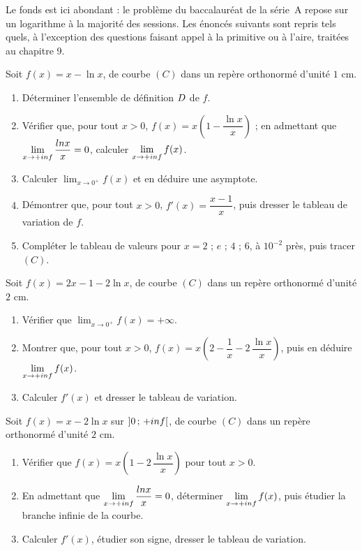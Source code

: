 \begin{annales}
Le fonds est ici abondant : le problème du baccalauréat de la série~A repose
sur un logarithme à la majorité des sessions. Les énoncés suivants sont
repris tels quels, à l'exception des questions faisant appel à la primitive
ou à l'aire, traitées au chapitre 9.

Soit $f(x) = x-\ln x$, de courbe $(C)$ dans un repère orthonormé d'unité
$1$ cm.
\begin{enumerate}[label=\textbf{\alph*)}, leftmargin=*, itemsep=0.15em]
  \item Déterminer l'ensemble de définition $D$ de $f$.
  \item Vérifier que, pour tout $x>0$,
        $f(x) = x\left(1-\dfrac{\ln x}{x}\right)$ ; en admettant que
        $\limpinf \dfrac{\ln x}{x} = 0$, calculer $\limpinf f(x)$.
  \item Calculer $\displaystyle\lim_{x \to 0^{+}} f(x)$ et en déduire une
        asymptote.
  \item Démontrer que, pour tout $x>0$, $f'(x) = \dfrac{x-1}{x}$, puis
        dresser le tableau de variation de $f$.
  \item Compléter le tableau de valeurs pour $x = 2$ ; $e$ ; $4$ ; $6$, à
        $10^{-2}$ près, puis tracer $(C)$.
\end{enumerate}

Soit $f(x) = 2x-1-2\ln x$, de courbe $(C)$ dans un repère orthonormé
d'unité $2$ cm.
\begin{enumerate}[label=\textbf{\alph*)}, leftmargin=*, itemsep=0.15em]
  \item Vérifier que $\displaystyle\lim_{x \to 0^{+}} f(x) = +\infty$.
  \item Montrer que, pour tout $x>0$,
        $f(x) = x\left(2-\dfrac1x-2\,\dfrac{\ln x}{x}\right)$, puis en
        déduire $\limpinf f(x)$.
  \item Calculer $f'(x)$ et dresser le tableau de variation.
\end{enumerate}

Soit $f(x) = x-2\ln x$ sur $\left]0\,;\,+inf\right[$, de courbe $(C)$ dans
un repère orthonormé d'unité $2$ cm.
\begin{enumerate}[label=\textbf{\alph*)}, leftmargin=*, itemsep=0.15em]
  \item Vérifier que $f(x) = x\left(1-2\,\dfrac{\ln x}{x}\right)$ pour tout
        $x>0$.
  \item En admettant que $\limpinf \dfrac{\ln x}{x} = 0$, déterminer
        $\limpinf f(x)$, puis étudier la branche infinie de la courbe.
  \item Calculer $f'(x)$, étudier son signe, dresser le tableau de
        variation.
\end{enumerate}


\end{annales}
